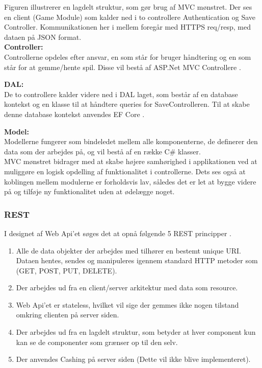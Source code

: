 \noindent Figuren illustrerer en lagdelt struktur, som gør brug af MVC mønstret. Der ses en client (Game Module) som kalder ned i to controllere Authentication og Save Controller. Kommunikationen her i mellem foregår med HTTPS req/resp, med dataen på JSON format.\\

\noindent \textbf{Controller:}\\
Controllerne opdeles efter ansvar, en som står for bruger håndtering og en som står for at gemme/hente spil. Disse vil bestå af ASP.Net MVC Controllere \cite{MVCcontroller}.

\noindent \textbf{DAL:}\\
De to controllere kalder videre ned i DAL laget, som består af en database kontekst og en klasse til at håndtere queries for SaveControlleren. Til at skabe denne database kontekst anvendes EF Core \cite{EFCore}.

\noindent \textbf{Model:}\\
Modellerne fungerer som bindeledet mellem alle komponenterne, de definerer den data som der arbejdes på, og vil bestå af en række C\# klasser.\\

\noindent MVC mønstret bidrager med at skabe højere samhørighed i applikationen ved at muliggøre en logisk opdelling af funktionalitet i controllerne. Dets ses også at koblingen mellem modulerne er forholdsvis lav, således det er let at bygge videre på og tilføje ny funktionalitet uden at ødelægge noget.\\

\subsubsection{REST}
I designet af Web Api'et søges det at opnå følgende 5 REST principper \cite{REST}.

\begin{enumerate}
 \item Alle de data objekter der arbejdes med tilhører en bestemt unique URI. Dataen hentes, sendes og manipuleres igennem standard HTTP metoder som (GET, POST, PUT, DELETE).
 \item Der arbejdes ud fra en client/server arkitektur med data som resource. 
 \item Web Api’et er stateless, hvilket vil sige der gemmes ikke nogen tilstand omkring clienten på server siden.
 \item Der arbejdes ud fra en lagdelt struktur, som betyder at hver component kun kan se de componenter som grænser op til den selv.
 \item Der anvendes Cashing på server siden (Dette vil ikke blive implementeret).
\end{enumerate}

